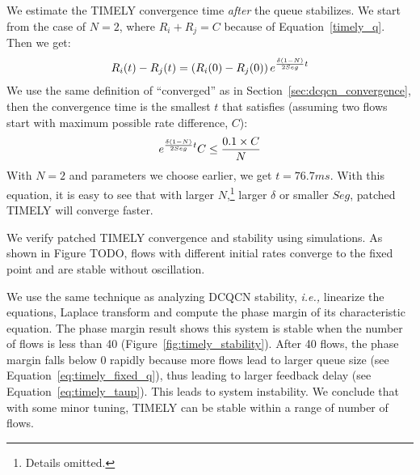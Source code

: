  We estimate the TIMELY convergence time {\em after}
the queue stabilizes. We start from the case of $N=2$, where $R_i + R_j = C$ because of Equation~\ref{timely_q}.
Then we get:
\begin{equation}
\small
{R_i}(t) - {R_j}(t) = \left( {{R_i}(0) - {R_j}(0)} \right){e^{\frac{{\delta (1 - N)}}{{2Seg}}t}}
\end{equation}
We use the same definition of ``converged'' as in Section~\ref{sec:dcqcn_convergence}, then the convergence
time is the smallest $t$ that satisfies (assuming two flows start with maximum possible rate difference, $C$):
\begin{equation}
\small
{e^{\frac{{\delta (1 - N)}}{{2Seg}}t}}C \le \frac{{0.1 \times C}}{N}
\end{equation}
With $N=2$ and parameters we choose earlier, we get $t = 76.7ms$. With this equation, it is easy to see that
with larger $N$,\footnote{Details omitted.} larger $\delta$ or smaller $Seg$, patched TIMELY will converge faster.

We verify patched TIMELY convergence and stability using simulations. As shown in Figure TODO, flows with different 
initial rates converge to the fixed point and are stable without oscillation. 

 We use the same technique as analyzing
DCQCN stability, {\em i.e.,} linearize the equations, Laplace transform and compute the phase margin 
of its characteristic equation. The phase margin result shows this system is stable when the number of 
flows is less than 40 (Figure~\ref{fig:timely_stability}). After 40 flows, the phase margin falls below 
0 rapidly because more flows lead to larger queue size (see Equation~\ref{eq:timely_fixed_q}), 
thus leading to larger feedback delay (see Equation~\ref{eq:timely_taup}). 
This leads to system instability. We conclude that with some minor tuning, TIMELY can be stable 
within a range of number of flows.
